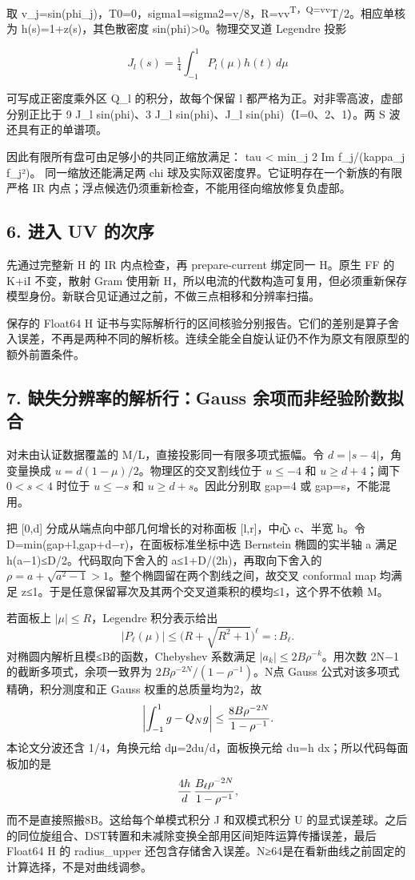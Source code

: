 \documentclass[
  11pt,
  a4paper,
]{article}
\begin{document}
取
v\_j=sin(phi\_j)，T0=0，sigma1=sigma2=v/8，R=vv\textsuperscript{T，Q=vv}T/2。相应单核为
h(s)=1+z(s)，其色散密度 sin(phi)\textgreater0。物理交叉道 Legendre 投影

\[
J_l(s)=\tfrac14\int_{-1}^1 P_l(\mu)h(t)\,d\mu
\]

可写成正密度乘外区 Q\_l 的积分，故每个保留 l
都严格为正。对非零高波，虚部分别正比于 9 J\_l sin(phi)、3 J\_l
sin(phi)、J\_l sin(phi)（I=0、2、1）。两 S 波还具有正的单谱项。

因此有限所有盘可由足够小的共同正缩放满足： tau \textless{} min\_j 2 Im
f\_j/(kappa\_j \textbar f\_j\textbar²)。 同一缩放还能满足两 chi
球及实际双密度界。它证明存在一个新族的有限严格 IR
内点；浮点候选仍须重新检查，不能用径向缩放修复负虚部。

\subsection{6. 进入 UV 的次序}\label{ux8fdbux5165-uv-ux7684ux6b21ux5e8f}

先通过完整新 H 的 IR 内点检查，再 prepare-current 绑定同一 H。原生 FF 的
K+iI 不变，散射 Gram 使用新
H，所以电流的代数构造可复用，但必须重新保存模型身份。新联合见证通过之前，不做三点相移和分辨率扫描。

保存的 Float64 H
证书与实际解析行的区间核验分别报告。它们的差别是算子舍入误差，不再是两种不同的解析核。连续全能全自旋认证仍不作为原文有限原型的额外前置条件。

\subsection{7. 缺失分辨率的解析行：Gauss
余项而非经验阶数拟合}\label{ux7f3aux5931ux5206ux8fa8ux7387ux7684ux89e3ux6790ux884cgauss-ux4f59ux9879ux800cux975eux7ecfux9a8cux9636ux6570ux62dfux5408}

对未由认证数据覆盖的 M/L，直接投影同一有限多项式振幅。令
\(d=|s-4|\)，角变量换成 \(u=d(1-\mu)/2\)。物理区的交叉割线位于
\(u\le-4\) 和 \(u\ge d+4\)；阈下 \(0<s<4\) 时位于 \(u\le-s\) 和
\(u\ge d+s\)。因此分别取 gap=4 或 gap=s，不能混用。

把 {[}0,d{]} 分成从端点向中部几何增长的对称面板 {[}l,r{]}，中心 c、半宽
h。令 D=min(gap+l,gap+d−r)，在面板标准坐标中选 Bernstein 椭圆的实半轴 a
满足 h(a−1)≤D/2。代码取向下舍入的 a≤1+D/(2h)，再取向下舍入的
\(\rho=a+\sqrt{a^2-1}>1\)。整个椭圆留在两个割线之间，故交叉 conformal
map 均满足
\textbar z\textbar≤1。于是任意保留幂次及其两个交叉道乘积的模均≤1，这个界不依赖
M。

若面板上 \(|\mu|\le R\)，Legendre 积分表示给出 \[
|P_\ell(\mu)|\le\bigl(R+\sqrt{R^2+1}\bigr)^\ell=:B_\ell.
\] 对椭圆内解析且模≤B的函数，Chebyshev 系数满足
\(|a_k|\le2B\rho^{-k}\)。用次数 2N−1 的截断多项式，余项一致界为
\(2B\rho^{-2N}/(1-\rho^{-1})\)。N点 Gauss
公式对该多项式精确，积分测度和正 Gauss 权重的总质量均为2，故 \[
\left|\int_{-1}^1g-Q_Ng\right|
\le {8B\rho^{-2N}\over1-\rho^{-1}}.
\] 本论文分波还含 1/4，角换元给 dμ=2du/d，面板换元给 du=h
dx；所以代码每面板加的是 \[
{4h\over d}\,{B_\ell\rho^{-2N}\over1-\rho^{-1}},
\] 而不是直接照搬8B。这给每个单模式积分 J 和双模式积分 U
的显式误差球。之后的同位旋组合、DST转置和未减除变换全部用区间矩阵运算传播误差，最后
Float64 H 的 radius\_upper
还包含存储舍入误差。N≥64是在看新曲线之前固定的计算选择，不是对曲线调参。
\end{document}
